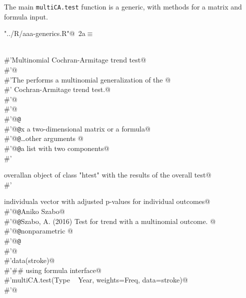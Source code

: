 \documentclass[reqno]{amsart}
\renewcommand{\NWtarget}[2]{\hypertarget{#1}{#2}}
\begin{document}
The main \texttt{multiCA.test} function is a generic, with methods for a matrix and formula input.

\begin{flushleft} \small
\begin{minipage}{\linewidth}\label{scrap1}\raggedright\small
\NWtarget{nuweb2a}{} \verb@"../R/aaa-generics.R"@\nobreak\ {\footnotesize {2a}}$\equiv$
\vspace{-1ex}
\begin{list}{}{} \item
\mbox{}\verb@@\\
\mbox{}\verb@#'Multinomial Cochran-Armitage trend test@\\
\mbox{}\verb@#'@\\
\mbox{}\verb@#'The  performs a multinomial generalization of the @\\
\mbox{}\verb@#' Cochran-Armitage trend test.@\\
\mbox{}\verb@#'@\\
\mbox{}\verb@#'@\\
\mbox{}\verb@#'@{\tt @}\verb@export@\\
\mbox{}\verb@#'@{\tt @}\verb@param x a two-dimensional matrix or a formula@\\
\mbox{}\verb@#'@{\tt @}\verb@param \dots other arguments @\\
\mbox{}\verb@#'@{\tt @}\verb@return a list with two components@\\
\mbox{}\verb@#' \item{overall}{an object of class "htest" with the results of the overall test}@\\
\mbox{}\verb@#' \item{individual}{a vector with adjusted p-values for individual outcomes}@\\
\mbox{}\verb@#'@{\tt @}\verb@author Aniko Szabo@\\
\mbox{}\verb@#'@{\tt @}\verb@references Szabo, A. (2016) Test for trend with a multinomial outcome.  @\\
\mbox{}\verb@#'@{\tt @}\verb@keywords nonparametric @\\
\mbox{}\verb@#'@{\tt @}\verb@examples@\\
\mbox{}\verb@#'@\\
\mbox{}\verb@#'data(stroke)@\\
\mbox{}\verb@#'## using formula interface@\\
\mbox{}\verb@#'multiCA.test(Type ~ Year, weights=Freq, data=stroke)@\\
\mbox{}\verb@#'@\\

\end{list}
\end{minipage}
\end{flushleft}
\end{document}
